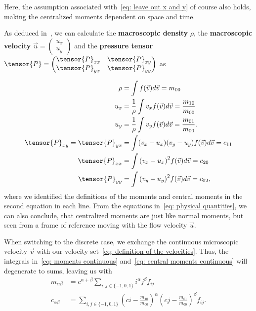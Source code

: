 Here, the assumption associated with~\eqref{eq: leave out x and y} of course also holds, making the centralized moments dependent on space and time.

As deduced in~\cite[pages 23 ff.]{harris2004introduction}, we can calculate the \textbf{macroscopic density} $\rho$, the \textbf{macroscopic velocity} $\vec{u}=\begin{pmatrix}u_x\\u_y\end{pmatrix}$ and the \textbf{pressure tensor} $\tensor{P}=\begin{pmatrix}\tensor{P}_{xx}&\tensor{P}_{xy}\\ \tensor{P}_{yx}&\tensor{P}_{yy}\end{pmatrix}$ as

\begin{equation}
  \label{eq: physical quantities}
  \begin{aligned}
    \rho & = \int f(\vec{v}) d\vec{v} = m_{00} \\
    u_x
    & = \frac{1}{\rho}\int v_x f(\vec{v}) d\vec{v} = \frac{ m_{10} }{ m_{00} }\\
    u_y
    & = \frac{1}{\rho}\int v_y f(\vec{v}) d\vec{v} = \frac{ m_{01} }{ m_{00} }.\\
    \tensor{P}_{xy}=\tensor{P}_{yx}
    & = \int (v_x - u_x)(v_y - u_y) f(\vec{v}) d\vec{v}
      = c_{11} \\
    \tensor{P}_{xx}
    & = \int {(v_x - u_x)}^2 f(\vec{v}) d\vec{v}
      = c_{20} \\
    \tensor{P}_{yy}
    & = \int {(v_y - u_y)}^2 f(\vec{v}) d\vec{v}
      = c_{02},
  \end{aligned}
\end{equation}
where we identified the definitions of the moments and central moments in the second equation in each line.
From the equations in~\eqref{eq: physical quantities}, we can also conclude, that centralized moments are just like normal moments, but seen from a frame of reference moving with the flow velocity $\vec{u}$.

When switching to the discrete case, we exchange the continuous microscopic velocity $\vec{v}$ with our velocity set~\eqref{eq: definition of the velocities}.
Thus, the integrals in~\eqref{eq: moments continuous} and~\eqref{eq: central moments continuous} will degenerate to sums, leaving us with
\begin{align}
  m_{\alpha\beta} &= c^{\alpha + \beta}\sum_{i,j \in \{-1,0,1\}} i^\alpha j^\beta f_{ij}
  \label{eq: moment definition}\\
  c_{\alpha\beta} &= \sum_{i,j \in \{-1,0,1\}}
  {\left(ci - \frac{m_{10}}{m_{00}}\right)}^\alpha
  {\left(cj - \frac{m_{01}}{m_{00}}\right)}^\beta f_{ij}.
  \label{eq: central moment definition}
\end{align}

